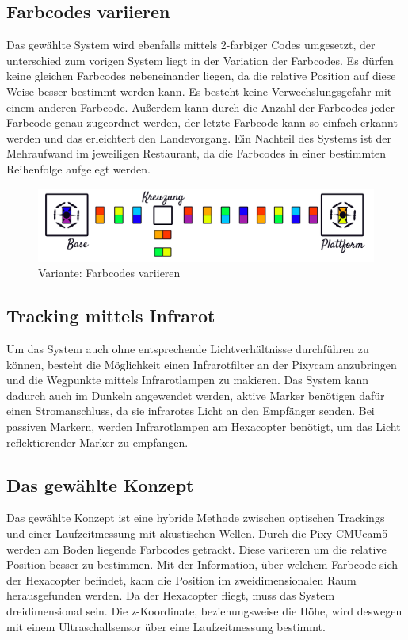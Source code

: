   \subsection*{Farbcodes variieren}
  Das gewählte System wird ebenfalls mittels 2-farbiger Codes umgesetzt, der unterschied zum vorigen System liegt in der Variation der Farbcodes. Es dürfen keine gleichen Farbcodes nebeneinander liegen, da die relative Position auf diese Weise besser bestimmt werden kann. Es besteht keine Verwechslungsgefahr mit einem anderen Farbcode. Außerdem kann durch die Anzahl der Farbcodes jeder Farbcode genau zugeordnet werden, der letzte Farbcode kann so einfach erkannt werden und das erleichtert den Landevorgang.
  Ein Nachteil des Systems ist der Mehraufwand im jeweiligen Restaurant, da die Farbcodes in einer bestimmten Reihenfolge aufgelegt werden.

      \begin{figure}[H]
      \begin{centering}
        \includegraphics[width = \textwidth]{Bilder/bor_var2}
      \par\end{centering}
      \caption{Variante: Farbcodes variieren}
      \label{Variante2}
    \end{figure}

  \subsection*{Tracking mittels Infrarot}
  Um das System auch ohne entsprechende Lichtverhältnisse durchführen zu können, besteht die Möglichkeit einen Infrarotfilter an der Pixycam anzubringen und die Wegpunkte mittels Infrarotlampen zu makieren. Das System kann dadurch auch im Dunkeln angewendet werden, aktive Marker benötigen dafür einen Stromanschluss, da sie infrarotes Licht an den Empfänger senden. Bei passiven Markern, werden Infrarotlampen am Hexacopter benötigt, um das Licht reflektierender Marker zu empfangen.

  \subsection{Das gewählte Konzept}
  Das gewählte Konzept ist eine hybride Methode zwischen optischen Trackings und einer Laufzeitmessung mit akustischen Wellen.
  Durch die Pixy CMUcam5 werden am Boden liegende Farbcodes getrackt. Diese variieren um die relative Position besser zu bestimmen. Mit der Information, über welchem Farbcode sich der Hexacopter befindet, kann die Position im zweidimensionalen Raum herausgefunden werden. Da der Hexacopter fliegt, muss das System dreidimensional sein. Die z-Koordinate, beziehungsweise die Höhe, wird deswegen mit einem Ultraschallsensor über eine Laufzeitmessung bestimmt.

